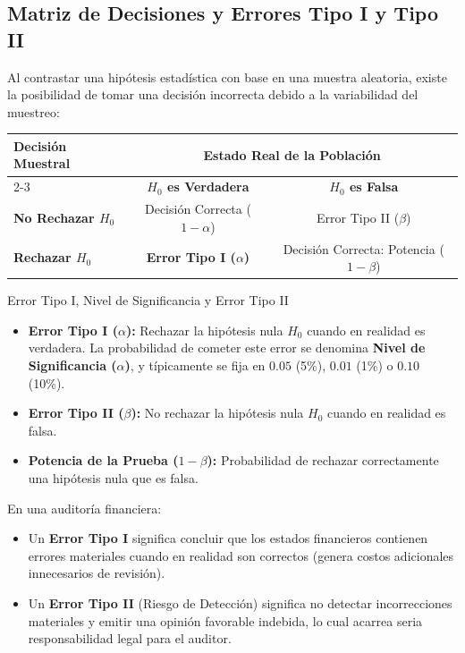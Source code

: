 \subsection{Matriz de Decisiones y Errores Tipo I y Tipo II}
Al contrastar una hipótesis estadística con base en una muestra aleatoria, existe la posibilidad de tomar una decisión incorrecta debido a la variabilidad del muestreo:

\begin{center}
\small
\begin{tabular}{l|c|c}
\toprule
\multirow{2}{*}{\textbf{Decisión Muestral}} & \multicolumn{2}{c}{\textbf{Estado Real de la Población}} \\
\cmidrule{2-3}
& \textbf{$H_0$ es Verdadera} & \textbf{$H_0$ es Falsa} \\
\midrule
\textbf{No Rechazar $H_0$} & Decisión Correcta ($1 - \alpha$) & Error Tipo II ($\beta$) \\
\textbf{Rechazar $H_0$} & \textbf{Error Tipo I ($\alpha$)} & Decisión Correcta: Potencia ($1 - \beta$) \\
\bottomrule
\end{tabular}
\end{center}

\begin{definicion}{Error Tipo I, Nivel de Significancia y Error Tipo II}
\begin{itemize}
    \item \textbf{Error Tipo I ($\alpha$):} Rechazar la hipótesis nula $H_0$ cuando en realidad es verdadera. La probabilidad de cometer este error se denomina \textbf{Nivel de Significancia ($\alpha$)}, y típicamente se fija en $0.05$ (5\%), $0.01$ (1\%) o $0.10$ (10\%).
    \item \textbf{Error Tipo II ($\beta$):} No rechazar la hipótesis nula $H_0$ cuando en realidad es falsa.
    \item \textbf{Potencia de la Prueba ($1 - \beta$):} Probabilidad de rechazar correctamente una hipótesis nula que es falsa.
\end{itemize}
\end{definicion}

\begin{alerta}
En una auditoría financiera:
\begin{itemize}
    \item Un \textbf{Error Tipo I} significa concluir que los estados financieros contienen errores materiales cuando en realidad son correctos (genera costos adicionales innecesarios de revisión).
    \item Un \textbf{Error Tipo II} (Riesgo de Detección) significa no detectar incorrecciones materiales y emitir una opinión favorable indebida, lo cual acarrea seria responsabilidad legal para el auditor.
\end{itemize}
\end{alerta}

